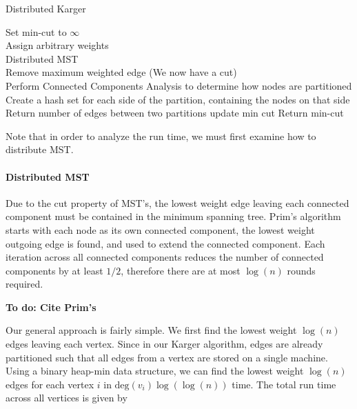 \documentclass[12pt]{article}
\begin{document}
\LinesNumbered
\begin{algorithm}[H]
\caption{Distributed Karger}
Set min-cut to $\infty$ \\
 {
  Assign arbitrary weights \\
  Distributed MST \\
  Remove maximum weighted edge (We now have a cut) \\
  Perform Connected Components Analysis to determine how nodes are partitioned \\
  Create a hash set for each side of the partition, containing the nodes on that side \\
  \Reduce{} {
    Return number of edges between two partitions
  }
   {
    update min cut
  }
}
Return min-cut
\end{algorithm}

Note that in order to analyze the run time, we must first examine how to distribute MST.

\paragraph{Distributed MST}

Due to the cut property of MST's, the lowest weight edge leaving each connected component must be contained in the minimum spanning tree. Prim's algorithm starts with each node as its own connected component, the lowest weight outgoing edge is found, and used to extend the connected component. Each iteration across all connected components reduces the number of connected components by at least $1/2$, therefore there are at most $\log(n)$ rounds required. 

\textbf{To do: Cite Prim's}

Our general approach is fairly simple. We first find the lowest weight $\log(n)$ edges leaving each vertex. Since in our Karger algorithm, edges are already partitioned such that all edges from a vertex are stored on a single machine. Using a binary heap-min data structure, we can find the lowest weight $\log(n)$ edges for each vertex $i$ in $\text{deg}(v_i) \log(\log(n))$ time. The total run time across all vertices is given by
\end{document}
